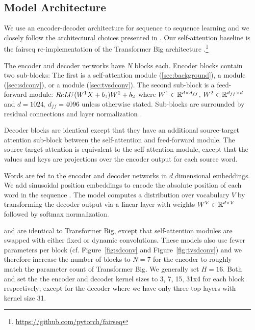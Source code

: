
\subsection{Model Architecture}\label{sec:architecture}

We use an encoder-decoder architecture for sequence to sequence learning \citep{sutskever2014sequence} and we closely follow the architectural choices presented in \citet{vaswani2017transformer}.
Our self-attention baseline is the fairseq re-implementation of the Transformer Big architecture  \citep{ott2018scaling}.\footnote{\url{https://github.com/pytorch/fairseq}}

The encoder and decoder networks have $N$ blocks each.
Encoder blocks contain two sub-blocks: The first is a self-attention module (\textsection\ref{sec:background}), a \sdconv{} module (\ref{sec:sdconv}), or a \tvsdconv{} module (\textsection\ref{sec:tvsdconv}).
The second sub-block is a feed-forward module: $ReLU({W}^1 {X} + b_1) {W}^2 + b_2$ where ${W}^1 \in \mathbb{R}^{d \times d_{ff}}$, ${W}^2 \in \mathbb{R}^{d_{ff} \times d}$ and $d=1024$, $d_{ff}=4096$ unless otherwise stated.
Sub-blocks are surrounded by residual connections \citep{he2015deep} and layer normalization \citep{ba2016layer}. 

Decoder blocks are identical except that they have an additional source-target attention sub-block between the self-attention and feed-forward module. 
The source-target attention is equivalent to the self-attention module, except that the values and keys are projections over the encoder output for each source word.

Words are fed to the encoder and decoder networks in $d$ dimensional embeddings. We add sinusoidal position embeddings to encode the absolute position of each word in the sequence \citep{kaiser2017depthwise,vaswani2017transformer}.
The model computes a distribution over vocabulary $V$ by transforming the decoder output via a linear layer with weights ${W}^V \in \mathbb{R}^{d \times V}$ followed by softmax normalization. 

\sdconv{} and \tvsdconv{} are identical to Transformer Big, except that self-attention modules are swapped with either fixed or dynamic convolutions.
These models also use fewer parameters per block (cf. Figure~\ref{fig:sdconv} and Figure~\ref{fig:tvsdconv}) and we 
therefore increase the number of blocks to $N=7$ for the encoder to roughly match the parameter count of Transformer Big.
We generally set $H=16$.
Both \sdconv{} and \tvsdconv{} set the the encoder and decoder kernel sizes to 3, 7, 15, 31x4 for each block respectively; except for the decoder where we have only three top layers with kernel size 31.




